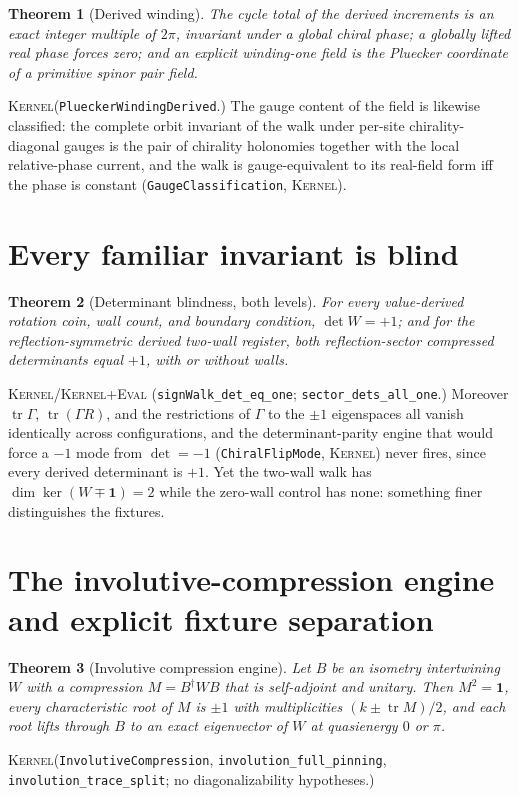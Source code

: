\documentclass[11pt]{article}
\newcommand{\id}{\mathbf{1}}
\newcommand{\tr}{\operatorname{tr}}
\newcommand{\Kernel}{\textcolor{kernelcolor}{\textsc{Kernel}}}
\newcommand{\DraftTrust}{\textcolor{draftcolor}{\textsc{Kernel+Eval}}}
\newtheorem{theorem}{Theorem}
\begin{document}
\begin{theorem}[Derived winding]\label{thm:winding}
The cycle total of the derived increments is an exact integer multiple of
$2\pi$, invariant under a global chiral phase; a globally lifted real phase
forces zero; and an explicit winding-one field is the Pluecker coordinate
of a primitive spinor pair field.
\end{theorem}
\noindent\Kernel{}\quad(\texttt{PlueckerWindingDerived}.)  The gauge
content of the field is likewise classified: the complete orbit invariant
of the walk under per-site chirality-diagonal gauges is the pair of
chirality holonomies together with the local relative-phase current, and
the walk is gauge-equivalent to its real-field form iff the phase is
constant \cite{CompanionDerivation} (\texttt{GaugeClassification},
\Kernel{}).

\section{Every familiar invariant is blind}

\begin{theorem}[Determinant blindness, both levels]\label{thm:blind}
For every value-derived rotation coin, wall count, and boundary condition,
$\det W=+1$; and for the reflection-symmetric derived two-wall register,
both reflection-sector compressed determinants equal $+1$, with or without
walls.
\end{theorem}
\noindent\Kernel{}/\DraftTrust{}\quad
(\texttt{signWalk\_det\_eq\_one}; \texttt{sector\_dets\_all\_one}.)
Moreover $\tr\Gamma$, $\tr(\Gamma R)$, and the restrictions of $\Gamma$ to
the $\pm1$ eigenspaces all vanish identically across configurations, and
the determinant-parity engine that would force a $-1$ mode from
$\det=-1$ (\texttt{ChiralFlipMode}, \Kernel{}) never fires, since every
derived determinant is $+1$.  Yet
the two-wall walk has $\dim\ker(W\mp\id)=2$ while the zero-wall control has
none: something finer distinguishes the fixtures.

\section{The involutive-compression engine and explicit fixture separation}

\begin{theorem}[Involutive compression engine]\label{thm:engine}
Let $B$ be an isometry intertwining $W$ with a compression $M=B^\dagger WB$
that is self-adjoint and unitary.  Then $M^2=\id$, every characteristic
root of $M$ is $\pm1$ with multiplicities $(k\pm\tr M)/2$, and each root
lifts through $B$ to an exact eigenvector of $W$ at quasienergy $0$ or
$\pi$.
\end{theorem}
\noindent\Kernel{}\quad(\texttt{InvolutiveCompression},
\texttt{involution\_full\_pinning}, \texttt{involution\_trace\_split};
no diagonalizability hypotheses.)
\end{document}
